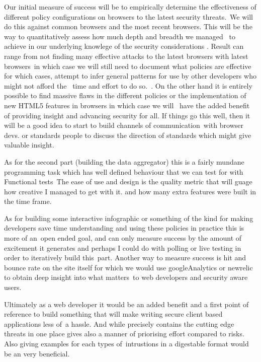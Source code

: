 \documentclass[a4paper,12pt]{paper}
\begin{document}
Our initial measure of success will be to empirically determine the effectiveness of different policy configurations on browsers to the latest security threats.\
We will do this against common browsers and the most recent browsers. This will be the way to quantitatively assess how much depth and breadth we managed \
to achieve in our underlying knowlege of the security considerations . Result can range from not finding many effective attacks to the latest browsers with latest browsers\
in which case we will still need to document what policies are effective for which cases, attempt to infer general patterns for use by other developers who might not afford the \
time and effort to do so.\ .
On the other hand it is entirely possible to find massive flaws in the different policies or the implementation of new HTML5 features in browsers in which case we will \
have the added benefit of providing insight and advancing security for all. If things go this well, then it will be a good idea to start to build channels of communication\
with browser devs. or standards people to discuss the direction of standards which might give valuable insight.\

As for the second part (building the data aggregator) this is a fairly mundane programming task which has well defined behaviour that we can test for with Functional tests\
The ease of use and design is the quality metric that will guage how creative I managed to get with it. and how many extra features were built in the time frame.\

As for building some interactive infographic or something of the kind for making developers save time understanding and using these policies in practice this is more of an\
open ended goal, and can only measure success by the amount of excitement it generates and perhaps I could do with polling or live testing in order to iteratively build this\
part. Another way to measure success is hit and bounce rate on the site itself for which we would use googleAnalytics or newrelic to obtain deep insight into what matters\
to web developers and security aware users.\

Ultimately as a web developer it would be an added benefit and a first point of reference to build something that will make writing secure client based applications less of\
a hassle. And while precisely contains the cutting edge threats in one place gives also a manner of priorising effort compared to risks. Also giving examples for each types of\
intrustions in a digestable format would be an very beneficial.\
\end{document}
